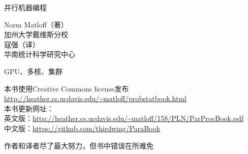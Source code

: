 \pagecolor{yellow}
\color{black}

\bigskip
\vspace{0.5in}
\bigskip
\begin{center}
{\Huge 并行机器编程}

{\LARGE Norm Matloff（著）\\
加州大学戴维斯分校\\
\medskip
寇强（译）\\
华南统计科学研究中心
}





\bigskip

\vspace{0.5in}

{\LARGE GPU、多核、集群}
\end{center}
\vspace{1in}



\vspace{1.5in}
\noindent 本书使用Creative Commons license发布\\
\url{http://heather.cs.ucdavis.edu/~matloff/probstatbook.html}\\
\medskip
\noindent 本书更新网址：\\
英文版：\url{http://heather.cs.ucdavis.edu/~matloff/158/PLN/ParProcBook.pdf}\\
中文版：\url{https://github.com/thirdwing/ParaBook}

\medskip
\noindent 作者和译者尽了最大努力，但书中错误在所难免

\newpage
